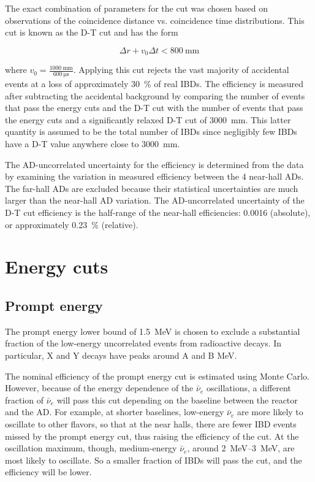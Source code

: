\documentclass{ucbthesis}
\newcommand{\nuebar}{\ensuremath{\bar{\nu}_e}}
\newcommand{\mev}{\mega\electronvolt}
\begin{document}
The exact combination of parameters for the cut was chosen based on observations
of the coincidence distance vs. coincidence time distributions.
This cut is known as the D-T cut and has the form

\begin{equation}
    \Delta r + v_0 \Delta t < \SI{800}{\milli\meter}
\end{equation}

where $v_0 = \frac{\SI{1000}{\milli\meter}}{\SI{600}{\micro\second}}$.
Applying this cut rejects the vast majority of accidental events
at a loss of approximately \SI{30}{\percent} of real IBDs.
The efficiency is measured after subtracting the accidental background
by comparing the number of events that pass the energy cuts and the D-T cut
with the number of events that pass the energy cuts
and a significantly relaxed D-T cut of \SI{3000}{\milli\meter}.
This latter quantity is assumed to be the total number of IBDs
since negligibly few IBDs have a D-T value anywhere close to \SI{3000}{\milli\meter}.

The AD-uncorrelated uncertainty for the efficiency
is determined from the data by examining the variation
in measured efficiency between the 4 near-hall ADs.
The far-hall ADs are excluded because
their statistical uncertainties are much larger than the
near-hall AD variation.
The AD-uncorrelated uncertainty of the D-T cut efficiency
is the half-range of the near-hall efficiencies: \num{0.0016} (absolute),
or approximately \SI{0.23}{\percent} (relative).

\section{Energy cuts}

\subsection{Prompt energy}
The prompt energy lower bound of \SI{1.5}{\mev}
is chosen to exclude a substantial fraction
of the low-energy uncorrelated events from radioactive decays.
In particular, X and Y decays have peaks around A and B \si{\mev}.

The nominal efficiency of the prompt energy cut is estimated using Monte Carlo.
However, because of the energy dependence of the \nuebar{} oscillations,
a different fraction of \nuebar{} will pass this cut
depending on the baseline between the reactor and the AD.
For example, at shorter baselines, low-energy \nuebar{}
are more likely to oscillate to other flavors, so that at the near halls,
there are fewer IBD events missed by the prompt energy cut,
thus raising the efficiency of the cut.
At the oscillation maximum, though, medium-energy \nuebar{},
around \SIrange{2}{3}{\mev}, are most likely to oscillate.
So a smaller fraction of IBDs will pass the cut,
and the efficiency will be lower.
\end{document}
